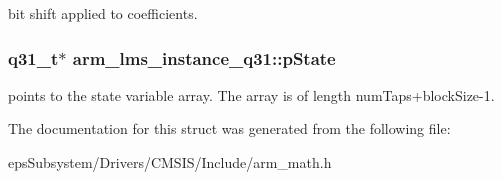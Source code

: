 bit shift applied to coefficients. \hypertarget{structarm__lms__instance__q31_a206d47b49de6f357f933ebe61520753c}{
\subsubsection[{p\-State}]{\setlength{\rightskip}{0pt plus 5cm}q31\-\_\-t$\ast$ arm\-\_\-lms\-\_\-instance\-\_\-q31\-::p\-State}}\label{structarm__lms__instance__q31_a206d47b49de6f357f933ebe61520753c}
points to the state variable array. The array is of length num\-Taps+block\-Size-\/1. 

The documentation for this struct was generated from the following file\-:\begin{DoxyCompactItemize}
\item 
eps\-Subsystem/\-Drivers/\-C\-M\-S\-I\-S/\-Include/arm\-\_\-math.\-h\end{DoxyCompactItemize}
